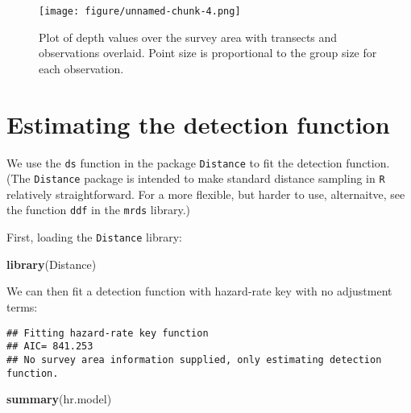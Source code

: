 \documentclass[]{article}
\newenvironment{Shaded}{}{}
\newcommand{\KeywordTok}[1]{\textcolor[rgb]{0.00,0.44,0.13}{\textbf{{#1}}}}
\newcommand{\DataTypeTok}[1]{\textcolor[rgb]{0.56,0.13,0.00}{{#1}}}
\newcommand{\StringTok}[1]{\textcolor[rgb]{0.25,0.44,0.63}{{#1}}}
\newcommand{\OtherTok}[1]{\textcolor[rgb]{0.00,0.44,0.13}{{#1}}}
\newcommand{\NormalTok}[1]{{#1}}
\begin{document}
\begin{figure}[htbp]
\centering
\texttt{[image: figure/unnamed-chunk-4.png]}
\caption{Plot of depth values over the survey area with transects and
observations overlaid. Point size is proportional to the group size for
each observation.}
\end{figure}

\section{Estimating the detection
function}\label{estimating-the-detection-function}

We use the \texttt{ds} function in the package \texttt{Distance} to fit
the detection function. (The \texttt{Distance} package is intended to
make standard distance sampling in \texttt{R} relatively
straightforward. For a more flexible, but harder to use, alternaitve,
see the function \texttt{ddf} in the \texttt{mrds} library.)

First, loading the \texttt{Distance} library:

\begin{Shaded}
\begin{Highlighting}[]
\KeywordTok{library}\NormalTok{(Distance)}
\end{Highlighting}
\end{Shaded}

We can then fit a detection function with hazard-rate key with no
adjustment terms:

\begin{Shaded}
\end{Shaded}

\begin{verbatim}
## Fitting hazard-rate key function
## AIC= 841.253
## No survey area information supplied, only estimating detection function.
\end{verbatim}

\begin{Shaded}
\begin{Highlighting}[]
\KeywordTok{summary}\NormalTok{(hr.model)}
\end{Highlighting}
\end{Shaded}
\end{document}
